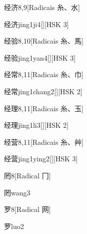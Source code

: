 \begin{entry}{经济}{8,9}[Radicais ⽷、⽔]
  \begin{phonetics}{经济}{jing1ji4}[][HSK 3]
  \end{phonetics}
\end{entry}

\begin{entry}{经验}{8,10}[Radicais ⽷、⾺]
  \begin{phonetics}{经验}{jing1yan4}[][HSK 3]
  \end{phonetics}
\end{entry}

\begin{entry}{经常}{8,11}[Radicais ⽷、⼱]
  \begin{phonetics}{经常}{jing1chang2}[][HSK 2]
  \end{phonetics}
\end{entry}

\begin{entry}{经理}{8,11}[Radicais ⽷、⽟]
  \begin{phonetics}{经理}{jing1li3}[][HSK 2]
  \end{phonetics}
\end{entry}

\begin{entry}{经营}{8,11}[Radicais ⽷、⾋]
  \begin{phonetics}{经营}{jing1ying2}[][HSK 3]
  \end{phonetics}
\end{entry}

\begin{entry}{罔}{8}[Radical ⼌]
  \begin{phonetics}{罔}{wang3}
  \end{phonetics}
\end{entry}

\begin{entry}{罗}{8}[Radical ⽹]
  \begin{phonetics}{罗}{luo2}
  \end{phonetics}
\end{entry}


